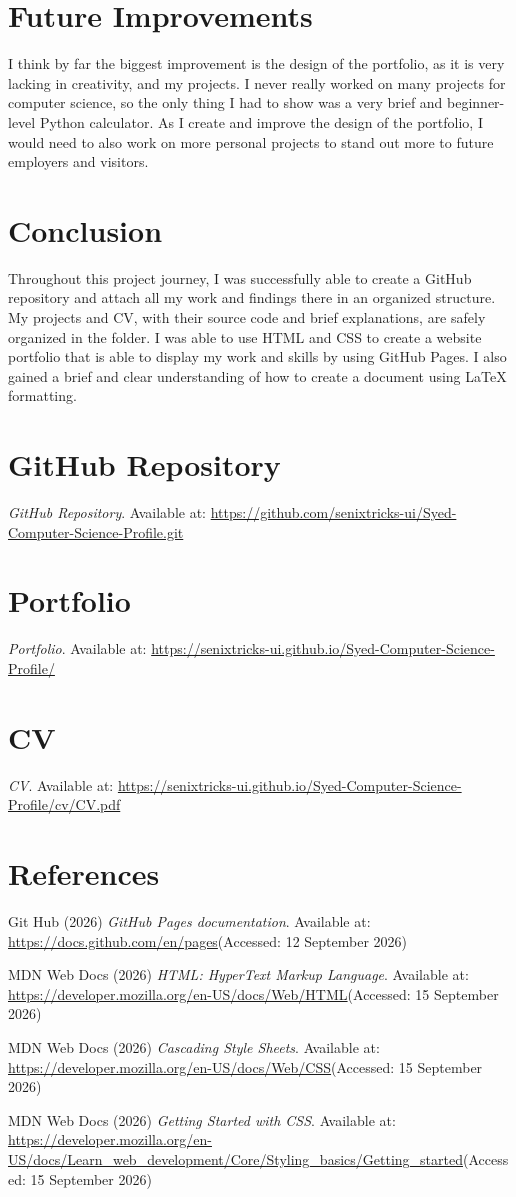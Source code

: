 \documentclass[12pt,a4paper]{article}
\begin{document}
\section{Future Improvements}
I think by far the biggest improvement is the design of the portfolio, as it is very lacking in creativity, and my projects. I never really worked on many projects for computer science, so the only thing I had to show was a very brief and beginner-level Python calculator. As I create and improve the design of the portfolio, I would need to also work on more personal projects to stand out more to future employers and visitors.


\section{Conclusion}
Throughout this project journey, I was successfully able to create a GitHub repository and attach all my work and findings there in an organized structure. My projects and CV, with their source code and brief explanations, are safely organized in the folder. I was able to use HTML and CSS to create a website portfolio that is able to display my work and skills by using GitHub Pages. I also gained a brief and clear understanding of how to create a document using LaTeX formatting.

\section{GitHub Repository}
\textit{GitHub Repository}. Available at: \url{https://github.com/senixtricks-ui/Syed-Computer-Science-Profile.git}
\section{Portfolio}
\textit{Portfolio}. Available at: \url{https://senixtricks-ui.github.io/Syed-Computer-Science-Profile/}
\section{CV}
\textit{CV}. Available at: \url{https://senixtricks-ui.github.io/Syed-Computer-Science-Profile/cv/CV.pdf}



\section{References}
Git Hub (2026) \textit{GitHub Pages documentation}. Available at: \url{https://docs.github.com/en/pages}(Accessed: 12 September 2026)

MDN Web Docs (2026) \textit{HTML: HyperText Markup Language}. Available at: \url{https://developer.mozilla.org/en-US/docs/Web/HTML}(Accessed: 15 September 2026)

MDN Web Docs (2026) \textit{Cascading Style Sheets}. Available at: \url{https://developer.mozilla.org/en-US/docs/Web/CSS}(Accessed: 15 September 2026)

MDN Web Docs (2026) \textit{ Getting Started with CSS}. Available at: \url{https://developer.mozilla.org/en-US/docs/Learn_web_development/Core/Styling_basics/Getting_started}(Accessed: 15 September 2026)
\end{document}
